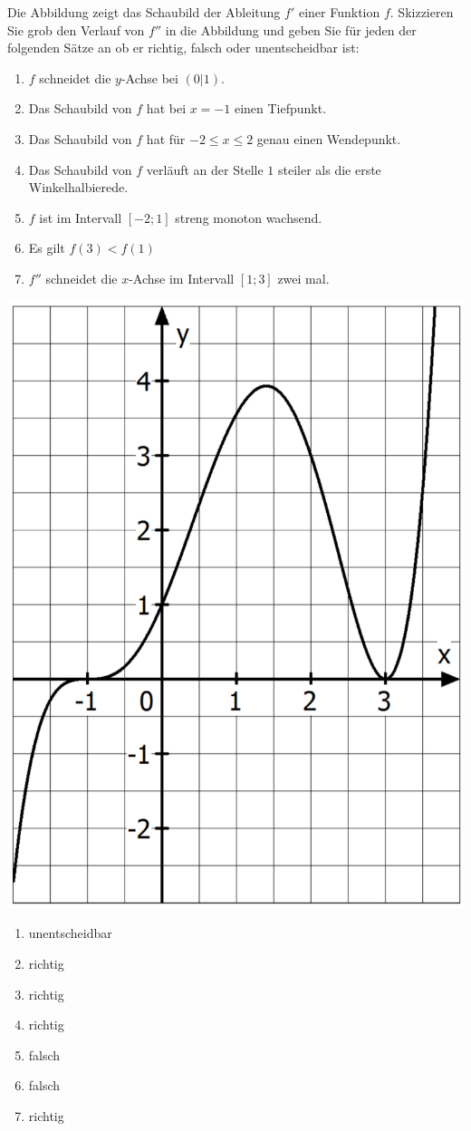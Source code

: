 \aufgabe{}
\begin{multicols}{2}
	Die Abbildung zeigt das Schaubild der Ableitung $f'$ einer Funktion $f$. Skizzieren Sie grob den Verlauf von $f''$ in die Abbildung und geben Sie für jeden der folgenden Sätze an ob er richtig, falsch oder unentscheidbar ist:
	\begin{enumerate}
		\item $f$ schneidet die $y$-Achse bei $(0|1)$.
		\item Das Schaubild von $f$ hat bei $x=-1$ einen Tiefpunkt.
		\item Das Schaubild von $f$ hat für $-2\leq x \leq 2$ genau einen Wendepunkt.
		\item Das Schaubild von $f$ verläuft an der Stelle $1$ steiler als die erste Winkelhalbierede.
		\item $f$ ist im Intervall $[-2;1]$ streng monoton wachsend.
		\item Es gilt $f(3)<f(1)$
		\item $f''$ schneidet die $x$-Achse im Intervall $[1;3]$ zwei mal.
	\end{enumerate}
	\columnbreak
	\centering
	\includegraphics[width=0.7\linewidth]{Monotonieanalyse.png}

\end{multicols}
\begin{lsg}{}
	\begin{multicols}{4}
		\begin{enumerate}
			\item unentscheidbar
			\item richtig
			\item richtig
			\item richtig
			\item falsch
			\item falsch
			\item richtig
		\end{enumerate}
	\end{multicols}
\end{lsg}

